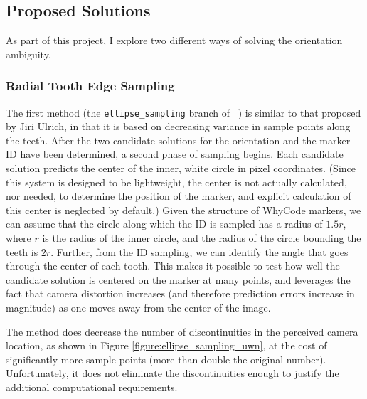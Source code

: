 \subsection{Proposed Solutions}

As part of this project, I explore two different ways of solving the orientation ambiguity.

\subsubsection{Radial Tooth Edge Sampling}

The first method (the \texttt{ellipse\_sampling} branch of ~\cite{uzgit_whycon}) is similar to that proposed by Jiri Ulrich,
in that it is based on decreasing variance in sample points along the teeth.
After the two candidate solutions for the orientation and the marker ID have been determined,
a second phase of sampling begins.
Each candidate solution predicts the center of the inner, white circle in pixel coordinates.
(Since this system is designed to be lightweight, the center is not actually calculated, nor needed, to determine the position of the marker,
and explicit calculation of this center is neglected by default.)
Given the structure of WhyCode markers, we can assume that the circle along which the ID is sampled
has a radius of $1.5r$, where $r$ is the radius of the inner circle, and the radius of the circle bounding the teeth is $2r$.
Further, from the ID sampling, we can identify the angle that goes through the center of each tooth.
This makes it possible to test how well the candidate solution is centered on the marker at many points,
and leverages the fact that camera distortion increases (and therefore prediction errors increase in magnitude) as one moves away from the center of the image.

The method does decrease the number of discontinuities in the perceived camera location, as shown in Figure \ref{figure:ellipse_sampling_uwn},
at the cost of significantly more sample points (more than double the original number).
Unfortunately, it does not eliminate the discontinuities enough to justify the additional computational requirements.

